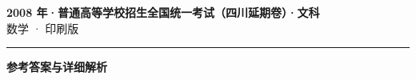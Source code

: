 \documentclass[zihao=5, a4paper]{ctexart}
\begin{document}
\begin{center}
  {\Large\bfseries 2008 年·普通高等学校招生全国统一考试（四川延期卷）·文科}\\[4pt]
  {\large 数学 · 印刷版}
\end{center}
\medskip
{}

\par\bigskip\hrule\bigskip
{}
\begin{center}{\large\bfseries 参考答案与详细解析}\end{center}
\smallskip

\end{document}
